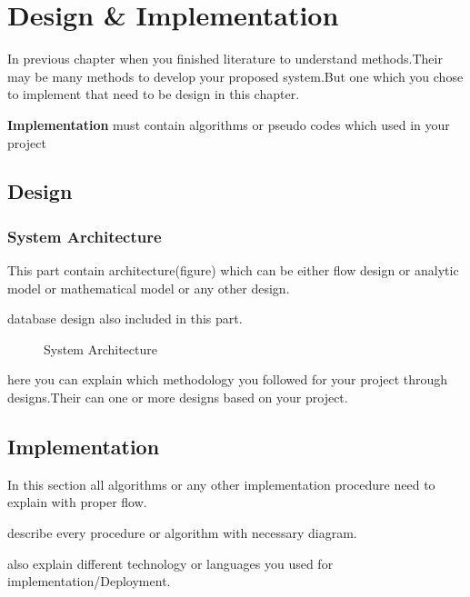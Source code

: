 \graphicspath{ {images/} }
\chapter{Design \& Implementation}
\hspace{5mm} In previous chapter when you finished literature to understand methods.Their may be many methods to develop your proposed system.But one which you chose to implement that need to be design in this chapter.
\par \textbf{Implementation} must contain algorithms or pseudo codes which used in your project

\section{Design}
\subsection{System Architecture}
\hspace{5mm}This part contain architecture(figure) which can be either flow design or analytic model or mathematical model or any other design.
\par database design also included in this part.
\begin{figure}[h!]
\begin{center}
\end{center}
\caption {System Architecture}
\label{vmb2}
\vspace{0mm}
\end{figure}

\par here you can explain which methodology you followed for your project through designs.Their can one or more designs based on your project.

\section{Implementation}
\hspace{5mm}In this section all algorithms or any other implementation procedure need to explain with proper flow.
\par describe every procedure or algorithm with necessary diagram.
\par also explain different technology or languages you used for implementation/Deployment.  


